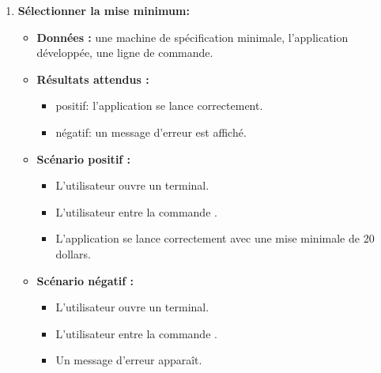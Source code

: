 \begin{enumerate}
    \item \textbf{Sélectionner la mise minimum:}
    \begin{itemize}
        \item \textbf{Données :} une machine de spécification minimale, l'application développée, une ligne de commande.
        \item \textbf{Résultats attendus :} 
        \begin{itemize}
            \item positif: l'application se lance correctement. \item négatif: un message d'erreur est affiché.
        \end{itemize}
        \item \textbf{Scénario positif :}
        \begin{itemize}
            \item L’utilisateur ouvre un terminal.
            \item L’utilisateur entre la commande .
            \item L'application se lance correctement avec une mise minimale de 20 dollars.
        \end{itemize}
        \item \textbf{Scénario négatif :}
        \begin{itemize}
            \item L’utilisateur ouvre un terminal.
            \item L’utilisateur entre la commande .
            \item Un message d'erreur apparaît.
        \end{itemize}
    \end{itemize}


\end{enumerate}
